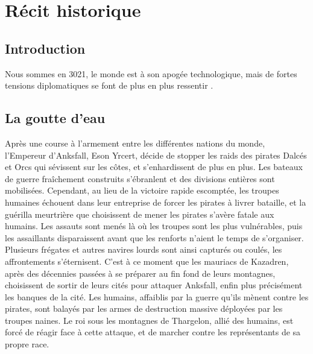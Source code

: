 \section{Récit historique}
\subsection{Introduction}
Nous sommes en 3021, le monde est à son apogée technologique, mais de fortes tensions diplomatiques se font de plus en plus ressentir .
\subsection{La goutte d'eau}
Après une course à l'armement entre les différentes nations du monde, l'Empereur d'Anksfall, Eson Yrcert, décide de stopper les raids des pirates Dalcés et Orcs qui sévissent sur les côtes, et s'enhardissent de plus en plus. Les bateaux de guerre fraîchement construits s'ébranlent et des divisions entières sont mobilisées. Cependant, au lieu de la victoire rapide escomptée, les troupes humaines échouent dans leur entreprise de forcer les pirates à livrer bataille, et la guérilla meurtrière que choisissent de mener les pirates s'avère fatale aux humains. Les assauts sont menés là où les troupes sont les plus vulnérables, puis les assaillants disparaissent avant que les renforts n'aient le temps de s'organiser. Plusieurs frégates et autres navires lourds sont ainsi capturés ou coulés, les affrontements s'éternisent. C'est à ce moment que les mauriacs de Kazadren, après des décennies passées à se préparer au fin fond de leurs montagnes, choisissent de sortir de leurs cités pour attaquer Anksfall, enfin plus précisément les banques de la cité. Les humains, affaiblis par la guerre qu'ils mènent contre les pirates, sont balayés par les armes de destruction massive déployées par les troupes naines. Le roi sous les montagnes de Thargelon, allié des humains, est forcé de réagir face à cette attaque, et de marcher contre les représentants de sa propre race. 
